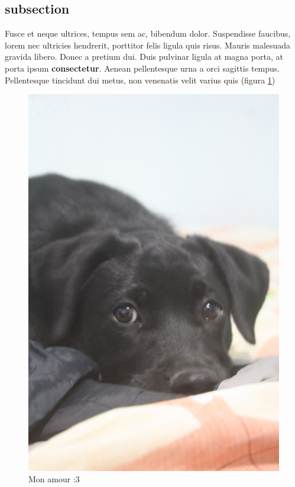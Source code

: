 \documentclass[12pt,letterpaper,oneside]{book}
\begin{document}
\subsection{subsection}
\noindent Fusce et neque ultrices, tempus sem ac, bibendum dolor. Suspendisse faucibus, lorem nec ultricies hendrerit, porttitor felis ligula quis risus. Mauris malesuada gravida libero. Donec a pretium dui. Duis pulvinar ligula at magna porta, at porta ipsum \textbf{consectetur}. Aenean pellentesque urna a orci sagittis tempus. Pellentesque tincidunt dui metus, non venenatis velit varius quis (figura \ref{milla_2})

\begin{figure}[ht]
\centering
\includegraphics[scale=.1]{img/milla.jpg}
\caption{Mon amour :3}
\label{milla_2}
\end{figure}
\end{document}
